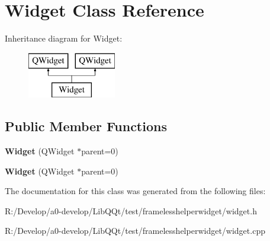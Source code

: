 \hypertarget{class_widget}{}\section{Widget Class Reference}
\label{class_widget}
Inheritance diagram for Widget\+:\begin{figure}[H]
\begin{center}
\leavevmode
\includegraphics[height=2.000000cm]{class_widget}
\end{center}
\end{figure}
\subsection*{Public Member Functions}
\begin{DoxyCompactItemize}
\item 
\mbox{\label{class_widget_a29531c7f141e461322981b3b579d4590}} 
{\bfseries Widget} (Q\+Widget $\ast$parent=0)
\item 
\mbox{\label{class_widget_a29531c7f141e461322981b3b579d4590}} 
{\bfseries Widget} (Q\+Widget $\ast$parent=0)
\end{DoxyCompactItemize}


The documentation for this class was generated from the following files\+:\begin{DoxyCompactItemize}
\item 
R\+:/\+Develop/a0-\/develop/\+Lib\+Q\+Qt/test/framelesshelperwidget/widget.\+h\item 
R\+:/\+Develop/a0-\/develop/\+Lib\+Q\+Qt/test/framelesshelperwidget/widget.\+cpp\end{DoxyCompactItemize}
